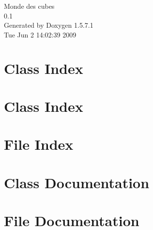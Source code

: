 \documentclass[a4paper]{book}
\begin{document}
\begin{titlepage}
\vspace*{7cm}
\begin{center}
{\Large Monde des cubes \\[1ex]\large 0.1 }\\
\vspace*{1cm}
{\large Generated by Doxygen 1.5.7.1}\\
\vspace*{0.5cm}
{\small Tue Jun 2 14:02:39 2009}\\
\end{center}
\end{titlepage}
\clearemptydoublepage
{}
\tableofcontents
\clearemptydoublepage
{}
\chapter{Class Index}

\chapter{Class Index}

\chapter{File Index}

\chapter{Class Documentation}


















\chapter{File Documentation}













\printindex
\end{document}
